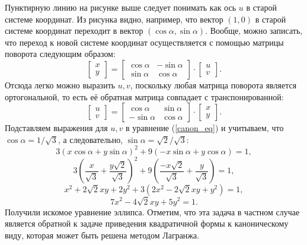 \documentclass[12pt]{article}
\begin{document}
\newpage\noindent Пунктирную линию на рисунке выше следует понимать как ось $u$ в старой системе координат. Из рисунка видно, например, что вектор $(1,0)$ в старой системе координат переходит в вектор $(\cos\alpha, \sin\alpha)$. Вообще, можно записать, что переход к новой системе координат осуществляется с помощью матрицы поворота следующим образом: 
\begin{equation*}
    \begin{bmatrix}
    x\\y
    \end{bmatrix}
    =
    \begin{bmatrix}
    \cos\alpha & -\sin\alpha \\
    \sin\alpha & \cos\alpha
    \end{bmatrix}
    \cdot
    \begin{bmatrix}
    u\\v
    \end{bmatrix}.
\end{equation*}
Отсюда легко можно выразить $u,v$, поскольку любая матрица поворота является ортогональной, то есть её обратная матрица совпадает с транспонированной:
\begin{equation*}
    \begin{bmatrix}
    u\\v
    \end{bmatrix}
    =
    \begin{bmatrix}
    \cos\alpha & \sin\alpha \\
    -\sin\alpha & \cos\alpha
    \end{bmatrix}
    \cdot
    \begin{bmatrix}
    x\\y
    \end{bmatrix}.
\end{equation*}
Подставляем выражения для $u,v$ в уравнение (\ref{canon_eq}) и учитываем, что $\cos\alpha = 1/\sqrt{3}$, а следовательно, $\sin\alpha = \sqrt{2}/\sqrt{3}$:
\begin{equation*}
    3(x\cos\alpha + y\sin\alpha)^2 + 9(-x\sin\alpha + y\cos\alpha) = 1,
\end{equation*}
\begin{equation*}
    3\left(\frac{x}{\sqrt{3}} + \frac{y\sqrt{2}}{\sqrt{3}}\right)^2 + 9\left(\frac{-x\sqrt{2}}{\sqrt{3}} + \frac{y}{\sqrt{3}}\right) = 1,
\end{equation*} \vspace{2mm}
\begin{equation*}
    x^2 + 2\sqrt{2}xy + 2y^2 + 3(2x^2 - 2\sqrt{2}xy + y^2) = 1,
\end{equation*}
\begin{equation*}
    7x^2 - 4\sqrt{2}xy + 5y^2 = 1.
\end{equation*}
Получили искомое уравнение эллипса. Отметим, что эта задача в частном случае является обратной к задаче приведения квадратичной формы к каноническому виду, которая может быть решена методом Лагранжа.
\end{document}
